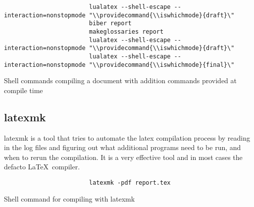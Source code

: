 \documentclass[hidelinks, float=false, crop=false]{standalone}
\begin{document}
            \begin{listing}[H]
                \begin{centering}
                    \begin{verbatim}
                        lualatex --shell-escape --interaction=nonstopmode "\\providecommand{\\iswhichmode}{draft}\"
                        biber report
                        makeglossaries report
                        lualatex --shell-escape --interaction=nonstopmode "\\providecommand{\\iswhichmode}{draft}\"
                        lualatex --shell-escape --interaction=nonstopmode "\\providecommand{\\iswhichmode}{final}\"
                    \end{verbatim}
                    \caption{Shell commands compiling a document with addition commands provided at compile time}
                    \label{lst:compilationwithcommands}
                \end{centering}
            \end{listing}

        \subsection{latexmk}
            latexmk is a tool that tries to automate the latex compilation process by reading in the log files and figuring out what additional programs need to be run, and when to rerun the compilation.
            It is a very effective tool and in most cases the defacto \LaTeX~compiler.
            \begin{listing}[H]
                \begin{centering}
                    \begin{verbatim}
                        latexmk -pdf report.tex
                    \end{verbatim}
                    \caption{Shell command for compiling with latexmk}
                    \label{lst:compilationwithcommands}
                \end{centering}
            \end{listing}
\end{document}
